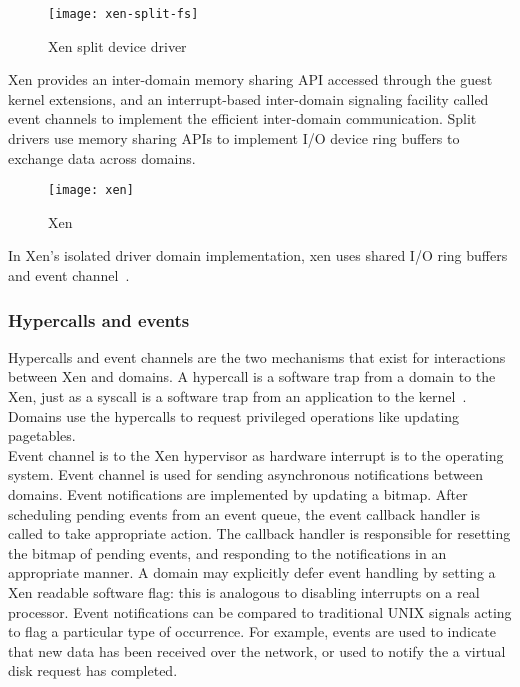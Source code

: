 \begin{figure}[!h]
\centering
\texttt{[image: xen-split-fs]}
\caption{Xen split device driver}
\label{xen-split2}
\end{figure}
Xen provides an inter-domain memory sharing API accessed through the guest kernel extensions, and an interrupt-based inter-domain signaling facility called event channels to implement the efficient inter-domain communication. Split drivers use memory sharing APIs to implement I/O device ring buffers to exchange data across domains.
\begin{figure}[!h]
\centering
\texttt{[image: xen]}
\caption{Xen}
\label{xen}
\end{figure}
In Xen's isolated driver domain implementation, xen uses shared I/O ring buffers and event channel~\cite{Barham:2003:XAV:1165389.945462, Nikolaev:2013:VOS:2517349.2522719, Ruslan}.

\subsubsection*{Hypercalls and events}
Hypercalls and event channels are the two mechanisms that exist for interactions between Xen and domains. A hypercall is a software trap from a domain to the Xen, just as a syscall is a software trap from an application to the kernel~\cite{hypercall}. Domains use the hypercalls to request privileged operations like updating pagetables. 
\\[3mm]
Event channel is to the Xen hypervisor as hardware interrupt is to the operating system. Event channel is used for sending asynchronous notifications between domains. Event notifications are implemented by updating a bitmap. After scheduling pending events from an event queue, the event callback handler is called to take appropriate action. The callback handler is responsible for resetting the bitmap of pending events, and responding to the notifications in an appropriate manner. A domain may explicitly defer event handling by setting a Xen readable software flag: this is analogous to disabling interrupts on a real processor. Event notifications can be compared to traditional UNIX signals acting to flag a particular type of occurrence. For example, events are used to indicate that new data has been received over the network, or used to notify the a virtual disk request has completed. 

